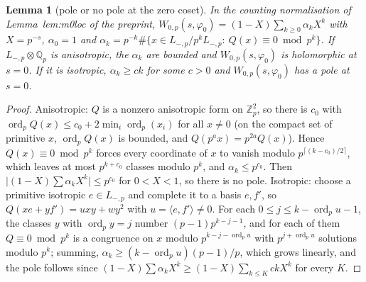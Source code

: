 \documentclass[11pt,reqno]{amsart}
\theoremstyle{plain}
\newtheorem{lemma}[theorem]{Lemma}
\theoremstyle{definition}
\DeclareMathOperator{\ord}{ord}
\newcommand{\Q}{\mathbb{Q}}
\newcommand{\Z}{\mathbb{Z}}
\begin{document}
\begin{lemma}[pole or no pole at the zero coset]\label{lem:pole}
In the counting normalisation of \textup{Lemma~lem:m0loc of the preprint}, $W_{0,p}(s,\varphi_0)=
(1-X)\sum_{k\ge0}\alpha_kX^k$ with $X=p^{-s}$, $\alpha_0=1$ and $\alpha_k=p^{-k}\#\{x\in
L_{-,p}/p^kL_{-,p}:\ Q(x)\equiv0\bmod p^k\}$. If $L_{-,p}\otimes\Q_p$ is anisotropic, the $\alpha_k$
are bounded and $W_{0,p}(s,\varphi_0)$ is holomorphic at $s=0$. If it is isotropic, $\alpha_k\ge
ck$ for some $c>0$ and $W_{0,p}(s,\varphi_0)$ has a pole at $s=0$.
\end{lemma}
\begin{proof}
Anisotropic: $Q$ is a nonzero anisotropic form on $\Z_p^2$, so there is $c_0$ with
$\ord_p Q(x)\le c_0+2\min_i\ord_p(x_i)$ for all $x\ne0$ (on the compact set of primitive $x$,
$\ord_pQ(x)$ is bounded, and $Q(p^ax)=p^{2a}Q(x)$). Hence $Q(x)\equiv0\bmod p^k$ forces every
coordinate of $x$ to vanish modulo $p^{\lceil(k-c_0)/2\rceil}$, which leaves at most $p^{k+c_0}$
classes modulo $p^k$, and $\alpha_k\le p^{c_0}$. Then $\lvert(1-X)\sum\alpha_kX^k\rvert\le p^{c_0}$
for $0<X<1$, so there is no pole. Isotropic: choose a primitive isotropic $e\in L_{-,p}$ and
complete it to a basis $e,f'$, so $Q(xe+yf')=uxy+wy^2$ with $u=\langle e,f'\rangle\ne0$. For each
$0\le j\le k-\ord_pu-1$, the classes $y$ with $\ord_py=j$ number $(p-1)p^{k-j-1}$, and for each of
them $Q\equiv0\bmod p^k$ is a congruence on $x$ modulo $p^{k-j-\ord_pu}$ with $p^{j+\ord_pu}$
solutions modulo $p^k$; summing, $\alpha_k\ge(k-\ord_pu)(p-1)/p$, which grows linearly, and the
pole follows since $(1-X)\sum\alpha_kX^k\ge(1-X)\sum_{k\le K}ckX^k$ for every $K$.
\end{proof}
\end{document}
